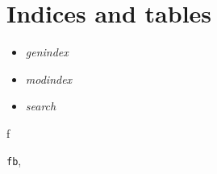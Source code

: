 \documentclass[letterpaper,10pt,english]{sphinxmanual}
\begin{document}
\chapter{Indices and tables}
\label{index:indices-and-tables}\begin{itemize}
\item {} 
\emph{genindex}

\item {} 
\emph{modindex}

\item {} 
\emph{search}

\end{itemize}


\renewcommand{\indexname}{Python Module Index}
\begin{theindex}
\def\bigletter#1{{\Large\sffamily#1}\nopagebreak\vspace{1mm}}
\bigletter{f}
\item {\texttt{fb}}, \pageref{index:module-fb}
\end{theindex}

\renewcommand{\indexname}{Index}
\printindex
\end{document}
